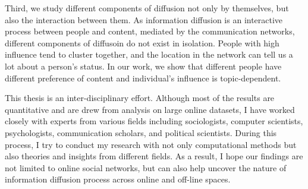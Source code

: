 \documentclass[phd,tocprelim]{cornell}
\begin{document}

Third, we study different components of diffusion not only by themselves, but also the interaction between them. As information diffusion is an interactive process between people and content, mediated by the communication networks, different components of diffusoin do not exist in isolation. People with high influence tend to cluster together\cite{Aral-2012}, and the location in the network can tell us a lot about a person's status\cite{Kempe-2003,Backstrom:2006}. In our work, we show that different people have different preference of content and individual's influence is topic-dependent.


This thesis is an inter-disciplinary effort. Although most of the results are quantitative and are drew from analysis on large online datasets, I have worked closely with experts from various fields including sociologists, computer scientists, psychologists, communication scholars, and political scientists. During this process, I try to conduct my research with not only computational methods but also theories and insights from different fields. As a result, I hope our findings are not limited to online social networks, but can also help uncover the nature of information diffusion process across online and off-line spaces.


\end{document}
